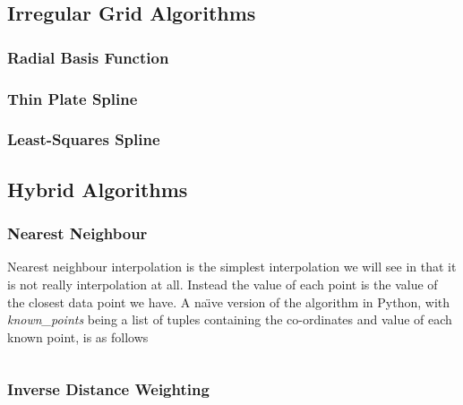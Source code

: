     \subsection{Irregular Grid Algorithms}\label{background_interpolation_methods_irregular_grid}

        \subsubsection{Radial Basis Function}\label{background_interpolation_methods_radial_basis_function}

        \subsubsection{Thin Plate Spline}\label{background_interpolation_methods_thin_plate_spline}

        \subsubsection{Least-Squares Spline}\label{background_interpolation_methods_least_squares_spline}

    \subsection{Hybrid Algorithms}\label{background_interpolation_methods_hybrid_algorithms}

        \subsubsection{Nearest Neighbour}\label{background_interpolation_methods_nearest_neighbour}

            Nearest neighbour interpolation is the simplest interpolation we will see in that it is not really interpolation at all. Instead the value of each point is the value of the closest data point we have. A na\"{\i}ve version of the algorithm in Python, with \emph{known\_points} being a list of tuples containing the co-ordinates and value of each known point, is as follows\:

            \inputminted[mathescape,linenos,numbersep=5pt,frame=lines,framesep=2mm]{python}{./code/nearest_neighbour.py}

        \subsubsection{Inverse Distance Weighting}\label{background_interpolation_methods_inversedistanceweighting}

